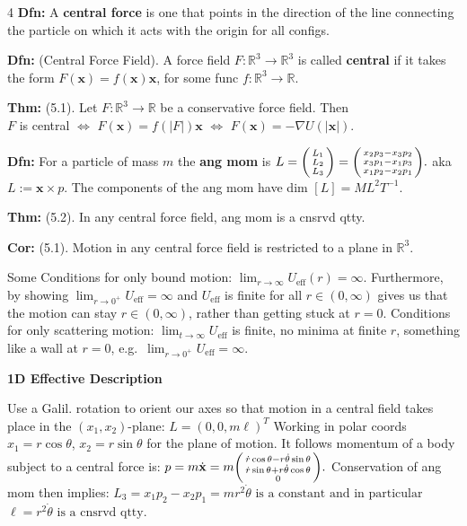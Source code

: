\documentclass[landscape, 8pt]{extarticle}
\begin{document}
\begin{multicols*}{4}
		\textbf{Dfn:} A \textbf{central force} is one that points in the direction of the line connecting the particle on which it acts with the origin for all configs.
		
		\textbf{Dfn:} (Central Force Field). A force field $F:\mathbb{R}^3\to\mathbb{R}^3$ is called \textbf{central} if it takes the form $F(\mathbf{x})=f(\mathbf{x})\mathbf{x}$, for some func $f:\mathbb{R}^3\to\mathbb{R}$.
		
		\textbf{Thm:} (5.1). Let $F:\mathbb{R}^3\to\mathbb{R}$ be a conservative force field. Then\\
			$F$ is central $\iff$ $F(\mathbf{x})=f(|F|)\mathbf{x}$ $\iff$ $F(\mathbf{x})=-\nabla U(|\mathbf{x}|)$.
		
		\textbf{Dfn:} For a particle of mass $m$ the \textbf{ang mom} is
		$
		L=\begin{psmallmatrix*}L_1\\L_2\\L_3\end{psmallmatrix*}=\begin{psmallmatrix*}x_2p_3-x_3p_2\\ x_3p_1-x_1p_3\\ x_1p_2-x_2p_1\end{psmallmatrix*}.
		$
		aka $L:=\mathbf{x}\times p$.
		The components of the ang mom have dim $[L]=ML^2T^{-1}$.
		
		\textbf{Thm:} (5.2). In any central force field, ang mom is a cnsrvd qtty.
		
		\textbf{Cor:} (5.1). Motion in any central force field is restricted to a plane in $\mathbb{R}^3$.
		
		 Some Conditions for only bound motion: $\lim_{r\to\infty}U_{\mathrm{eff}}(r)=\infty$. Furthermore, by showing $\lim_{r\to 0^+}U_{\mathrm{eff}}=\infty$ and $U_{\mathrm{eff}}$ is finite for all $r\in(0,\infty)$ gives us that the motion can stay $r\in(0,\infty)$, rather than getting stuck at $r=0$. Conditions for only scattering motion: $\lim_{t\to\infty}U_{\mathrm{eff}}$ is finite, no minima at finite $r$, something like a wall at $r=0$, e.g.\ $\lim_{r\to 0^+}U_{\mathrm{eff}}=\infty$.
		
		\textbf{1D Effective Description}
		
		Use a Galil. rotation to orient our axes so that motion in a central field takes place in the $(x_1,x_2)$-plane:
		$L=(0, 0, m\ell)^T$
		Working in polar coords $x_1=r\cos\theta$, $x_2=r\sin\theta$ for the plane of motion. It follows momentum of a body subject to a central force is:
		$
		p = m\dot{\mathbf{x}} = m\begin{psmallmatrix*}\dot{r}\cos\theta - r\dot\theta\sin\theta\\ \dot{r}\sin\theta+r\dot\theta\cos\theta\\ 0\end{psmallmatrix*}.
		$
		Conservation of ang mom then implies:
		$
		L_3 = x_1p_2-x_2p_1 = mr^2\dot\theta\text{ is a constant and in particular}
		$
		$
		\ell = r^2\dot\theta\text{ is a cnsrvd qtty.}
		$
		

\end{multicols*}
\end{document}
